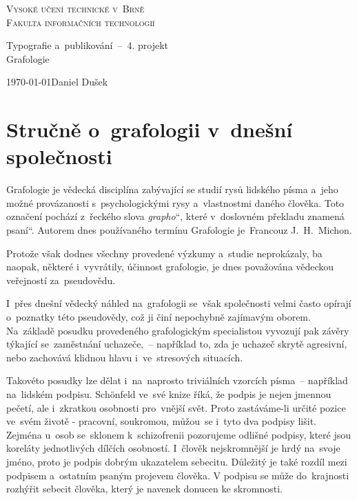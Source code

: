 \documentclass[a4paper, 11pt]{article}
\newcommand{\uv}[1]{\quotedblbase#1\textquotedblleft}
\begin{document}
\thispagestyle{empty}
\begin{center}
	\Huge
	\textsc{Vysoké učení technické v~Brně\\\vspace{-0.10cm}\huge{Fakulta informačních technologií}}\\
	\LARGE
		
		\LARGE{Typografie a~publikování \,--\ 4. projekt}\\\vspace{-0.05cm}\Huge{Grafologie}
	
	{\Large \today \hfill Daniel Dušek }
\end{center}

\newpage

\section*{Stručně o~grafologii v~dnešní společnosti}
\par Grafologie je vědecká disciplína zabývající se studií rysů lidského písma a~jeho možné provázanosti s~psychologickými rysy a~vlastnostmi daného člověka.
Toto označení pochází z~řeckého slova \uv{\textit{grapho}}, které v~doslovném překladu znamená \uv{psaní}. Autorem dnes používaného termínu Grafologie je~Francouz
J.~H.~Michon. \cite{MICHON}

\par Protože však dodnes všechny provedené výzkumy a~studie neprokázaly, ba naopak, některé i~vyvrátily, účinnost grafologie, je dnes považována vědeckou veřejností za~pseudovědu. \cite{DRIVER}

\par I~přes dnešní vědecký náhled na~grafologii se~však společnosti velmi často opírají o~poznatky této pseudovědy, což ji činí nepochybně zajímavým oborem. Na~základě posudku provedeného grafologickým specialistou
vyvozují pak závěry týkající se~zaměstnání uchazeče, \,-- například to, zda je uchazeč skrytě agresivní, nebo zachovává klidnou hlavu i~ve~stresových situacích.

\par Takovéto posudky lze dělat i~na~naprosto triviálních vzorcích písma \,-- například na~lidském podpisu. Schönfeld ve~své knize říká, že podpis je nejen jmennou pečetí, ale i~zkratkou osobnosti pro~vnější svět. Proto
zastáváme-li určité pozice ve~svém životě - pracovní, soukromou, můžou~se i~tyto dva podpisy lišit. Zejména u~osob se~sklonem k~schizofrenii pozorujeme odlišné podpisy, které jsou koreláty jednotlivých dílčích osobností. I~člověk nejskromnější je hrdý na~svoje jméno, proto je podpis dobrým ukazatelem sebecitu. Důležitý je také rozdíl mezi podpisem a~ostatním psaným projevem člověka. V podpisu se může do~krajnosti rozhýřit
sebecit člověka, který je navenek donucen ke skromnosti. \cite{SCHONFELD}
\end{document}
